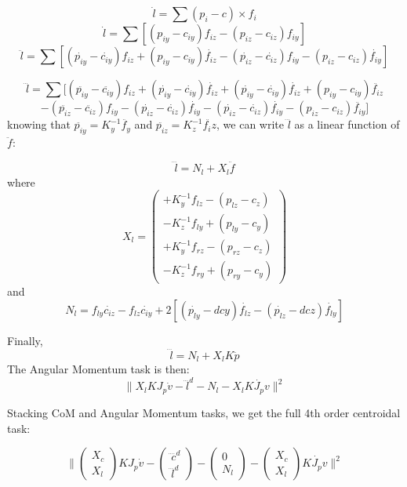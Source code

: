 \documentclass[12pt]{article}
\begin{document}
$$ \dot{l} = \sum (p_i - c) \times f_i $$
$$ \dot{l} = \sum [(p_{iy}-c_{iy})f_{iz} - (p_{iz}-c_{iz})f_{iy}]$$
$$ \ddot{l} = \sum [(\dot{p_{iy}}-\dot{c_{iy}})f_{iz} + (p_{iy}-c_{iy})\dot{f_{iz}} 
                  - (\dot{p_{iz}}-\dot{c_{iz}})f_{iy} - (p_{iz}-c_{iz})\dot{f_{iy}}]$$

$$ \dddot{l} = \sum [(\ddot{p_{iy}}-\ddot{c_{iy}})     f_{iz} + (\dot{p_{iy}}-\dot{c_{iy}}) \dot{f_{iz}}  
                     +(\dot{p_{iy}}- \dot{c_{iy}})\dot{f_{iz}} +     (p_{iy}-      c_{iy}) \ddot{f_{iz}}$$
$$                  -(\ddot{p_{iz}}-\ddot{c_{iz}})     f_{iy} - (\dot{p_{iz}}-\dot{c_{iz}}) \dot{f_{iy}} 
                     -(\dot{p_{iz}}- \dot{c_{iz}})\dot{f_{iy}} -     (p_{iz}-      c_{iz}) \ddot{f_{iy}}]$$
knowing that $\ddot{p_{iy}} = K_y^{-1} \ddot{f_y}$ and $\ddot{p_{iz}} = K_z^{-1} \ddot{f_iz}$, we can write $\dddot{l}$ as a linear function of $\ddot f$:

$$\dddot{l} = N_l + X_l \ddot f$$
where 
$$X_l= \begin{pmatrix} 
        +K_y^{-1}f_{lz} - (p_{lz} - c_z) \\
        -K_z^{-1}f_{ly} + (p_{ly} - c_y) \\
        +K_y^{-1}f_{rz} - (p_{rz} - c_z) \\
        -K_z^{-1}f_{ry} + (p_{ry} - c_y) 
\end{pmatrix}$$
and 
$$N_l= f_{ly}\dot{c_{iz}} - f_{lz}\dot{c_{iy}} + 2[(\dot{p_{ly}}-dcy)\dot{f_{lz}} - (\dot{p_{lz}}-dcz)\dot{f_{ly}}]$$

Finally, 
$$\dddot{l} = N_l + X_l K \ddot p$$
The Angular Momentum task is then:
$$\| X_l K J_p \dot{v} - \dddot{l}^d- N_l - X_l K \dot{J_p} v\|^2$$

Stacking CoM and Angular Momentum tasks, we get the full 4th order centroidal task:


$$\| \begin{pmatrix}  X_c \\ X_l \end{pmatrix} K J_p \dot{v} - \begin{pmatrix}  \ddddot{c}^d \\ \dddot{l}^d \end{pmatrix}- \begin{pmatrix}  0 \\ N_l \end{pmatrix} - \begin{pmatrix}  X_c \\ X_l \end{pmatrix} K \dot{J_p} v\|^2$$
\end{document}
